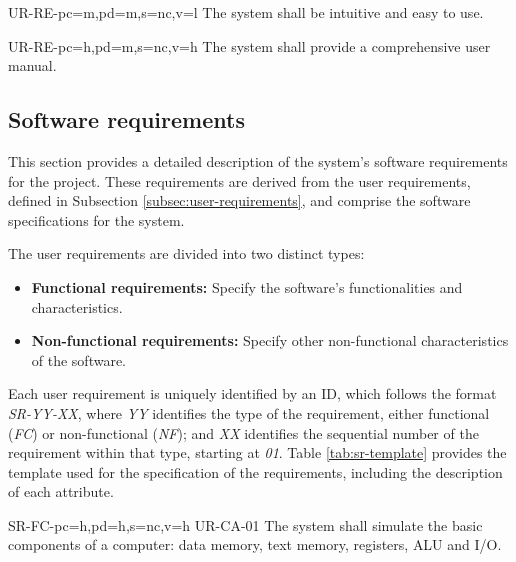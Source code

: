 \begin{userReq}{UR-RE-}{pc=m,pd=m,s=nc,v=l}
  The system shall be intuitive and easy to use.
\end{userReq}

\begin{userReq}{UR-RE-}{pc=h,pd=m,s=nc,v=h}
  The system shall provide a comprehensive user manual.
\end{userReq}


\FloatBarrier  %


\subsection{Software requirements}\label{subsec:soft-requirements}
This section provides a detailed description of the system's software requirements for the project. These requirements are derived from the user requirements, defined in Subsection \ref{subsec:user-requirements}, and comprise the software specifications for the system.

The user requirements are divided into two distinct types:
\begin{itemize}
  \item \textbf{Functional requirements:} Specify the software's functionalities and characteristics.
  \item \textbf{Non-functional requirements:} Specify other non-functional characteristics of the software.
\end{itemize}

Each user requirement is uniquely identified by an ID, which follows the format \textit{SR-YY-XX}, where \textit{YY} identifies the type of the requirement, either functional (\textit{FC}) or non-functional (\textit{NF}); and \textit{XX} identifies the sequential number of the requirement within that type, starting at \textit{01}. Table \ref{tab:sr-template} provides the template used for the specification of the requirements, including the description of each attribute.



\setcounter{i}{1}

\begin{softwareReq}{SR-FC-}{pc=h,pd=h,s=nc,v=h}
  {UR-CA-01}
  The system shall simulate the basic components of a computer: \gls{data memory}, \gls{text memory}, \glspl{register}, \gls{ALU} and \gls{I/O}.
\end{softwareReq}


